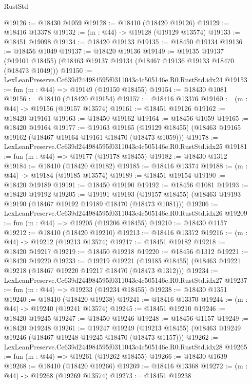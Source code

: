 \begin{lexlean}{RustStd}
\begin{coremodule}
@19126 := @18430 @1059
@19128 := @18410 (@18420 @19126)
@19129 := @18416 @13378
@19132 := (m : @44) -> @19128 (@19129 @13574)
@19133 := @18451 @19098
@19134 := @18420 @19133
@19135 := @18450 @19134
@19136 := @18456 @1049
@19137 := @18420 @19136
@19149 := @19135
    @19137
    (@19101 @18455)
    (@18463 @19137 @19134 (@18467 @19136 @19133 @18470 (@18473 @1049)))
@19150 := LexLeanPreserve.Cc639d244984595f0311043c4c505146e.R0.RustStd.idx24
@19153 := fun (m : @44) => @19149 (@19150 @18455)
@19154 := @18430 @1081
@19156 := @18410 (@18420 @19154)
@19157 := @18416 @13376
@19160 := (m : @44) -> @19156 (@19157 @13574)
@19161 := @18451 @19126
@19162 := @18420 @19161
@19163 := @18450 @19162
@19164 := @18456 @1059
@19165 := @18420 @19164
@19177 := @19163
    @19165
    (@19129 @18455)
    (@18463 @19165 @19162 (@18467 @19164 @19161 @18470 (@18473 @1059)))
@19178 := LexLeanPreserve.Cc639d244984595f0311043c4c505146e.R0.RustStd.idx25
@19181 := fun (m : @44) => @19177 (@19178 @18455)
@19182 := @18430 @1312
@19184 := @18410 (@18420 @19182)
@19185 := @18416 @13374
@19188 := (m : @44) -> @19184 (@19185 @13574)
@19189 := @18451 @19154
@19190 := @18420 @19189
@19191 := @18450 @19190
@19192 := @18456 @1081
@19193 := @18420 @19192
@19205 := @19191
    @19193
    (@19157 @18455)
    (@18463 @19193 @19190 (@18467 @19192 @19189 @18470 (@18473 @1081)))
@19206 := LexLeanPreserve.Cc639d244984595f0311043c4c505146e.R0.RustStd.idx26
@19209 := fun (m : @44) => @19205 (@19206 @18455)
@19210 := @18430 @1157
@19212 := @18410 (@18420 @19210)
@19213 := @18416 @13372
@19216 := (m : @44) -> @19212 (@19213 @13574)
@19217 := @18451 @19182
@19218 := @18420 @19217
@19219 := @18450 @19218
@19220 := @18456 @1312
@19221 := @18420 @19220
@19233 := @19219
    @19221
    (@19185 @18455)
    (@18463 @19221 @19218 (@18467 @19220 @19217 @18470 (@18473 @1312)))
@19234 := LexLeanPreserve.Cc639d244984595f0311043c4c505146e.R0.RustStd.idx27
@19237 := fun (m : @44) => @19233 (@19234 @18455)
@19238 := @18430 @1351
@19240 := @18410 (@18420 @19238)
@19241 := @18416 @13370
@19244 := (m : @44) -> @19240 (@19241 @13574)
@19245 := @18451 @19210
@19246 := @18420 @19245
@19247 := @18450 @19246
@19248 := @18456 @1157
@19249 := @18420 @19248
@19261 := @19247
    @19249
    (@19213 @18455)
    (@18463 @19249 @19246 (@18467 @19248 @19245 @18470 (@18473 @1157)))
@19262 := LexLeanPreserve.Cc639d244984595f0311043c4c505146e.R0.RustStd.idx28
@19265 := fun (m : @44) => @19261 (@19262 @18455)
@19266 := @18430 @1639
@19268 := @18410 (@18420 @19266)
@19269 := @18416 @13368
@19272 := (m : @44) -> @19268 (@19269 @13574)
@19273 := @18451 @19238

\end{coremodule}
\end{lexlean}
